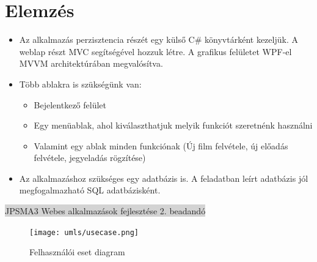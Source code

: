 \documentclass[11pt,a4paper]{article}
\begin{document}
\section{Elemzés}
\begin{itemize}
\item Az alkalmazás perzisztencia részét egy külső C\# könyvtárként kezeljük.
A weblap részt MVC segítségével hozzuk létre. A grafikus felületet WPF-el MVVM
architektúrában megvalósítva.
\item Több ablakra is szükségünk van:
\begin{itemize}
	\item Bejelentkező felület
	\item Egy menüablak, ahol kiválaszthatjuk melyik funkciót szeretnénk használni
	\item Valamint egy ablak minden funkciónak (Új film felvétele, új előadás felvétele,
	jegyeladás rögzítése)
\end{itemize}
\item Az alkalmazáshoz szükséges egy adatbázis is. A feladatban leírt adatbázis jól
megfogalmazható SQL adatbázisként.
\end{itemize}

\newpage
\begin{center}
\colorbox{lightgray}{{\large JPSMA3} \hspace{3cm} {\large Webes alkalmazások fejlesztése 2. beadandó} \hspace{5cm} \thepage}
\end{center}
\begin{figure}[h]
\centering
\texttt{[image: umls/usecase.png]}
\caption{Felhasználói eset diagram}
\end{figure}
\end{document}
